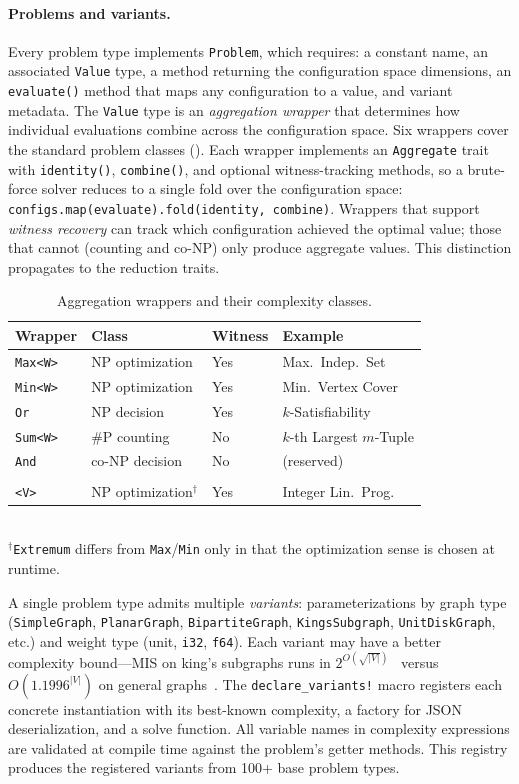 \documentclass[conference]{IEEEtran}
\begin{document}
\paragraph{Problems and variants.}
Every problem type implements \texttt{Problem}, which requires: a constant name, an associated \texttt{Value} type, a method returning the configuration space dimensions, an \texttt{evaluate()} method that maps any configuration to a value, and variant metadata.
The \texttt{Value} type is an \emph{aggregation wrapper} that determines how individual evaluations combine across the configuration space.
Six wrappers cover the standard problem classes ().
Each wrapper implements an \texttt{Aggregate} trait with \texttt{identity()}, \texttt{combine()}, and optional witness-tracking methods, so a brute-force solver reduces to a single fold over the configuration space: \texttt{configs.map(evaluate).fold(identity, combine)}.
Wrappers that support \emph{witness recovery} can track which configuration achieved the optimal value; those that cannot (counting and co-NP) only produce aggregate values.
This distinction propagates to the reduction traits.

\begin{table}[h]
\caption{Aggregation wrappers and their complexity classes.}\label{tab:wrappers}
\centering
\small
\begin{tabular}{@{}llll@{}}
\toprule
Wrapper & Class & Witness & Example \\
\midrule
\texttt{Max<W>} & NP optimization & Yes & Max.\ Indep.\ Set \\
\texttt{Min<W>} & NP optimization & Yes & Min.\ Vertex Cover \\
\texttt{Or}     & NP decision     & Yes & $k$-Satisfiability \\
\texttt{Sum<W>} & \#P counting    & No  & $k$-th Largest $m$-Tuple \\
\texttt{And}    & co-NP decision  & No  & (reserved) \\
\shortstack[l]{\texttt{Extremum}\\\texttt{<V>}} & NP optimization$^\dagger$ & Yes & Integer Lin.\ Prog. \\
\bottomrule
\end{tabular}
\\[2pt]
{\footnotesize $^\dagger$\texttt{Extremum} differs from \texttt{Max}/\texttt{Min} only in that the optimization sense is chosen at runtime.}
\end{table}
A single problem type admits multiple \emph{variants}: parameterizations by graph type (\texttt{SimpleGraph}, \texttt{PlanarGraph}, \texttt{BipartiteGraph}, \texttt{KingsSubgraph}, \texttt{UnitDiskGraph}, etc.) and weight type (unit, \texttt{i32}, \texttt{f64}).
Each variant may have a better complexity bound---MIS on king's subgraphs runs in $2^{O(\sqrt{|V|})}$~\cite{deBerg2020ETHTight} versus $O(1.1996^{|V|})$ on general graphs~\cite{Xiao2017MIS}.
The \texttt{declare\_variants!} macro registers each concrete instantiation with its best-known complexity, a factory for JSON deserialization, and a solve function.
All variable names in complexity expressions are validated at compile time against the problem's getter methods.
This registry produces the registered variants from 100+ base problem types.
\end{document}

